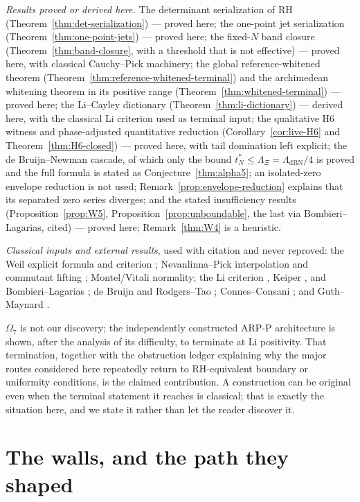 \documentclass[11pt]{amsart}
\theoremstyle{definition}
\theoremstyle{remark}
\theoremstyle{definition}
\begin{document}
\emph{Results proved or derived here.}  The determinant serialization of RH
(Theorem~\ref{thm:det-serialization}) --- proved here; the one-point jet serialization
(Theorem~\ref{thm:one-point-jets}) --- proved here; the fixed-$N$ band closure
(Theorem~\ref{thm:band-closure}, with a threshold that is not effective) --- proved here, with classical Cauchy--Pick machinery; the global
reference-whitened theorem (Theorem~\ref{thm:reference-whitened-terminal}) and the archimedean
whitening theorem in its positive range (Theorem~\ref{thm:whitened-terminal}) --- proved here; the Li--Cayley dictionary
(Theorem~\ref{thm:li-dictionary}) --- derived here, with the classical Li criterion used as terminal
input; the qualitative H6 witness and phase-adjusted quantitative reduction
(Corollary~\ref{cor:live-H6} and Theorem~\ref{thm:H6-closed}) --- proved here, with tail domination
left explicit; the de Bruijn--Newman cascade, of which only the bound $t_N^*\le\Lambda_\Xi=\Lambda_{\mathrm{dBN}}/4$ is proved and
the full formula is stated as Conjecture~\ref{thm:alpha5};
an isolated-zero envelope reduction is not used; Remark~\ref{prop:envelope-reduction} explains
that its separated zero series diverges;
and the stated insufficiency results (Proposition~\ref{prop:W5},
Proposition~\ref{prop:unboundable}, the last via Bombieri--Lagarias, cited) --- proved here; Remark~\ref{thm:W4} is a heuristic.

\emph{Classical inputs and external results}, used with citation and never reproved: the Weil explicit
formula and criterion \cite{Weil1952}; Nevanlinna--Pick interpolation and commutant lifting
\cite{FoiasFrazho}; Montel/Vitali normality; the Li criterion \cite{Li}, Keiper
\cite{Keiper1992}, and Bombieri--Lagarias \cite{BombieriLagarias1999}; de Bruijn \cite{deBruijn} and
Rodgers--Tao \cite{RodgersTao}; Connes--Consani \cite{connesconsani2021,ConnesConsani2023}; and Guth--Maynard
\cite{GuthMaynard}.

$\Omega_7$ is not our discovery; the independently constructed ARP-P architecture is shown, after the
analysis of its difficulty, to terminate at Li positivity.  That termination, together with the
obstruction ledger explaining why the major routes considered here repeatedly return to
RH-equivalent boundary or uniformity conditions, is the claimed contribution.  A construction can be
original even when the terminal statement it reaches is classical; that is exactly the situation here,
and we state it rather than let the reader discover it.

\part{The walls, and the path they shaped}
\end{document}
